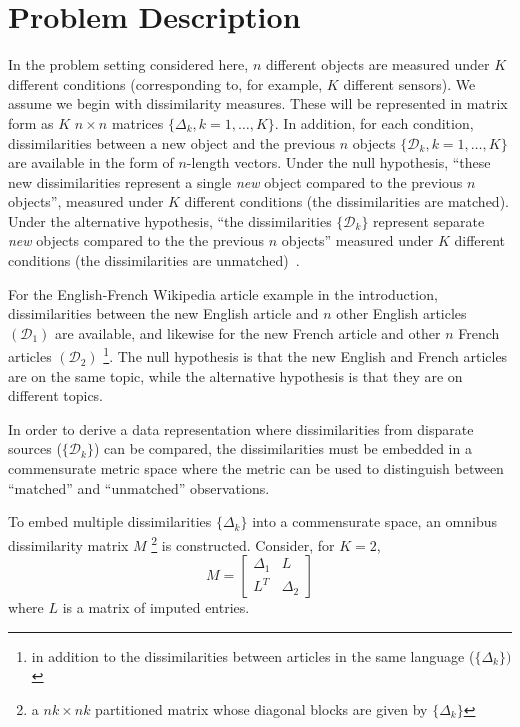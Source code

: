 \documentclass[12pt,oneside,final]{thesis}\usepackage[]{graphicx}\usepackage[]{color}
\begin{document}
\section{Problem Description \label{sec:jointembed}}
In the problem setting considered here,  $n$ different objects are measured under $K$ different conditions (corresponding  to, for example, $K$ different sensors). We assume we begin with dissimilarity measures. These will be represented in matrix form as $K$ $n \times n$ matrices $\{\Delta_k,k=1 ,\ldots,K\}$.  In addition, for each condition, dissimilarities between  a new object  and the previous 
$n$ objects $\{\mathcal{D}_k,k=1 ,\ldots,K\}$ are available in the form of $n$-length vectors. Under  the null hypothesis, ``these new dissimilarities represent a single \emph{new} object  compared to the previous $n$ objects'', measured under $K$ different conditions (the dissimilarities are matched). Under the alternative hypothesis, ``the dissimilarities $\{\mathcal{D}_k\}$ represent separate \emph{new} objects compared to the the previous $n$ objects''  measured under $K$ different conditions (the dissimilarities are unmatched)~\cite{JOFC}. %

For the English-French Wikipedia  article example in the introduction,  dissimilarities between the new English article and $n$ other English articles $(\mathcal{D}_1)$ are available, and likewise for the new French article  and other $n$ French articles $(\mathcal{D}_2)$ \footnote{in addition to the dissimilarities between articles in the same language  ($\{\Delta_k\})$ }. The null hypothesis is that the new English and French articles are on the same topic, while the alternative hypothesis is that they are on different topics.

  In order to derive a data representation where dissimilarities from disparate sources ($\{\mathcal{D}_k\}$)  can be compared, the dissimilarities must be embedded in a commensurate metric space where the metric can be used to distinguish between ``matched'' and ``unmatched'' observations.


To embed multiple dissimilarities  $\{\Delta_k\}$  into a commensurate space, an omnibus dissimilarity matrix  $M$ \footnote{a $nk \times nk$ partitioned matrix whose diagonal blocks are given by $\{\Delta_k\}$ }  is constructed. Consider, for $K=2$,
 \begin{equation}
M=  \left[ \begin{array}{cc}
         \Delta_1 & L\\
        L^T  & \Delta_2 
     \end{array}  \right]     \label{omnibus} 
\end{equation} where $L$ is a matrix of imputed entries.
\end{document}
